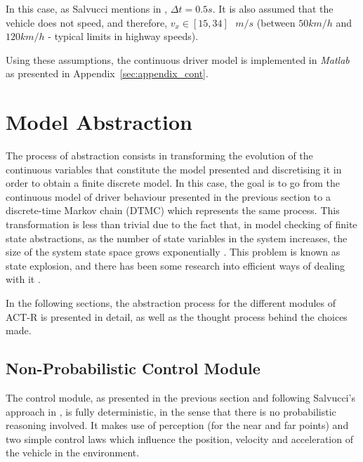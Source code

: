In this case, as Salvucci mentions in \cite{salvucci_1}, $\Delta t = 0.5s$. It is also assumed that the vehicle does not speed, and therefore, $v_x \in [15, 34]\text{ }m/s$ (between $50km/h$ and $120km/h$ - typical limits in highway speeds).

Using these assumptions, the continuous driver model is implemented in \textit{Matlab} as presented in Appendix~\ref{sec:appendix_cont}.

\section{Model Abstraction}

The process of abstraction consists in transforming the evolution of the continuous variables that constitute the model presented and discretising it in order to obtain a finite discrete model. In this case, the goal is to go from the continuous model of driver behaviour presented in the previous section to a discrete-time Markov chain (DTMC) which represents the same process. This transformation is less than trivial due to the fact that, in model checking of finite state abstractions, as the number of state variables in the system increases, the size of the system state space grows exponentially \cite{state_explosion}. This problem is known as state explosion, and there has been some research into efficient ways of dealing with it \cite{abstraction_1, abstraction_2}. 

In the following sections, the abstraction process for the different modules of ACT-R is presented in detail, as well as the thought process behind the choices made.

\subsection{Non-Probabilistic Control Module}

The control module, as presented in the previous section and following Salvucci's approach in \cite{salvucci_1}, is fully deterministic, in the sense that there is no probabilistic reasoning involved. It makes use of perception (for the near and far points) and two simple control laws which influence the position, velocity and acceleration of the vehicle in the environment.

